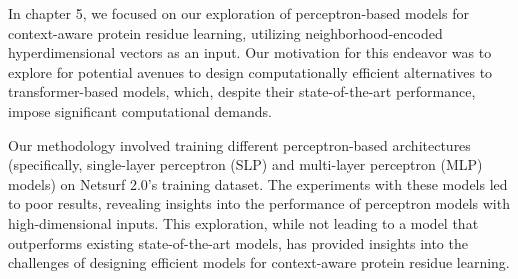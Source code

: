 In chapter 5, we focused on our exploration of perceptron-based models for context-aware protein residue learning, utilizing neighborhood-encoded hyperdimensional vectors as an input. Our motivation for this endeavor was to explore for potential avenues to design computationally efficient alternatives to transformer-based models, which, despite their state-of-the-art performance, impose significant computational demands.

Our methodology involved training different perceptron-based architectures (specifically, single-layer perceptron (SLP) and multi-layer perceptron (MLP) models) on Netsurf 2.0's training dataset. The experiments with these models led to poor results, revealing insights into the performance of perceptron models with high-dimensional inputs. This exploration, while not leading to a model that outperforms existing state-of-the-art models, has provided insights into the challenges of designing efficient models for context-aware protein residue learning.